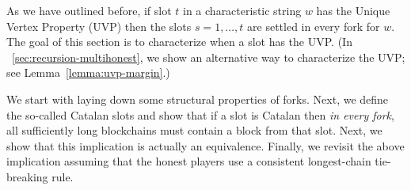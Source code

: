 As we have outlined before, 
if slot $t$ in a characteristic string $w$ 
has the Unique Vertex Property (UVP) 
then the slots $s = 1, \ldots, t$ 
are settled in every fork for $w$. 
The goal of this section is to 
characterize when a slot has the UVP. 
(In \Section~\ref{sec:recursion-multihonest}, we show an alternative way 
to characterize the UVP; see Lemma~\ref{lemma:uvp-margin}.) 

We start with laying down some structural properties of forks. 
Next, we define the so-called Catalan slots 
and show that if a slot is Catalan then \emph{in every fork}, all sufficiently long blockchains must contain a block from that slot. 
Next, we show that this implication is actually an equivalence. 
Finally, 
we revisit the above implication assuming 
that the honest players use a consistent longest-chain tie-breaking rule.





